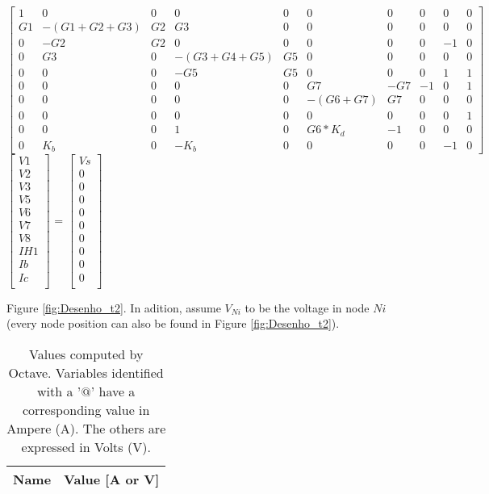 {\footnotesize

$ \begin{bmatrix}
1 & 0 & 0 & 0 & 0 & 0 & 0 & 0 & 0 & 0 \\
G1 & -(G1+G2+G3) & G2 & G3 & 0 & 0 & 0 & 0 & 0 & 0 \\
0 & -G2 & G2 & 0 & 0 & 0 & 0 & 0 & -1 & 0 \\
0 & G3 & 0 & -(G3+G4+G5) & G5 & 0 & 0 & 0 & 0 & 0 \\
0 & 0 & 0 & -G5 & G5 & 0 & 0 & 0 & 1 & 1 \\
0 & 0 & 0 & 0 & 0 & G7 & -G7 & -1 & 0 & 1 \\
0 & 0 & 0 & 0 & 0 & -(G6+G7) & G7 & 0 & 0 & 0 \\
0 & 0 & 0 & 0 & 0 & 0 & 0 & 0 & 0 & 1 \\
0 & 0 & 0 & 1 & 0 & G6*K_d & -1 & 0 & 0 & 0 \\
0 & K_b & 0 & -K_b & 0 & 0 & 0 & 0 & -1 & 0 
\end{bmatrix}  $
$ \begin{bmatrix}
V1 \\
V2 \\
V3 \\
V5 \\
V6 \\
V7 \\
V8 \\
IH1 \\
Ib \\
Ic \\
\end{bmatrix}  $
=
$ \begin{bmatrix}
Vs\\
0\\
0\\
0\\
0\\
0\\
0\\
0\\
0\\
0\\
\end{bmatrix}  $
}

Figure \ref{fig:Desenho_t2}. In adition, assume $V_{Ni}$ to be the voltage in node $Ni$ (every node position can
also be found in Figure \ref{fig:Desenho_t2}). \\

\begin{table}[H]
	\centering
	\begin{tabular}{|l|r|}
    		\hline    
    		{\bf Name} & {\bf Value [A or V]} \\ \hline
    		
  	\end{tabular}
  	\caption{Values computed by Octave. Variables identified with a '$@$' have a
  	corresponding value in Ampere (A). The others are expressed in Volts (V).}
 
\label{tab:node}
\end{table}
\newpage
